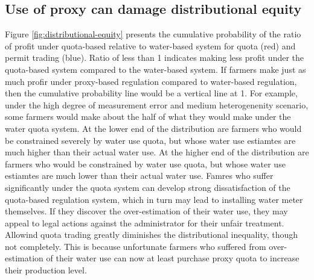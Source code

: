 \documentclass[
]{article}
\begin{document}
\hypertarget{use-of-proxy-can-damage-distributional-equity}{%
\subsection{Use of proxy can damage distributional equity}\label{use-of-proxy-can-damage-distributional-equity}}

Figure \ref{fig:distributional-equity} presents the cumulative probability of the ratio of profit under quota-based relative to water-based system for quota (red) and permit trading (blue). Ratio of less than 1 indicates making less profit under the quota-based system compared to the water-based system. If farmers make just as much profir under proxy-based regulation compared to water-based regulation, then the cumulative probability line would be a vertical line at 1. For example, under the high degree of measurement error and medium heterogenenity scenario, some farmers would make about the half of what they would make under the water quota system. At the lower end of the distribution are farmers who would be constrained severely by water use quota, but whose water use estiamtes are much higher than their actual water use. At the higher end of the distribution are farmers who would be constrained by water use quota, but whose water use estiamtes are much lower than their actual water use. Famres who suffer significantly under the quota system can develop strong dissatisfaction of the quota-based regulation system, which in turn may lead to installing water meter themselves. If they discover the over-estimation of their water use, they may appeal to legal actions against the administrator for their unfair treatment. Allowind quota trading greatly diminishes the distributional inequality, though not completely. This is because unfortunate farmers who suffered from over-estimation of their water use can now at least purchase proxy quota to increase their production level.
\end{document}

